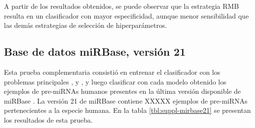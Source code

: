 A partir de los resultados obtenidos, se puede observar que la estrategia
RMB resulta en un clasificador con mayor especificidad, aunque menor
sensibilidad que las demás estrategias de selección de hiperparámetros.

\subsection{Base de datos miRBase, versión 21}
Esta prueba complementaria consistió en entrenar el clasificador con
los problemas principales \tripletsvm{}, \mipred{} y \micropred{}, y
luego clasificar con cada modelo obtenido los ejemplos de pre-miRNAs
humanos presentes en la última versión disponible de miRBase
\cite{mirbase3}. La versión 21 de miRBase contiene XXXXX ejemplos de
pre-miRNAs pertenecientes a la especie humana.  En la tabla
\autoref{tbl:suppl-mirbase21} se presentan los resultados de esta
prueba.